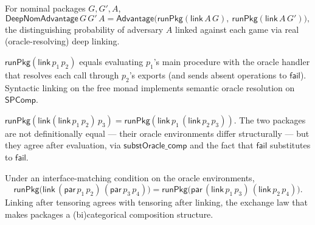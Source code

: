 \begin{definition}
  \label{def:deepnomadv}
  \leanok
  For nominal packages $G, G', A$,
  \[
    \mathsf{DeepNomAdvantage}\,G\,G'\,A =
    \mathsf{Advantage}\bigl(\mathsf{runPkg}(\mathsf{link}\,A\,G),\
    \mathsf{runPkg}(\mathsf{link}\,A\,G')\bigr),
  \]
  the distinguishing probability of adversary $A$ linked against each game via
  real (oracle-resolving) deep linking.
\end{definition}

\begin{theorem}
  \label{thm:runpkg-link}
  \leanok
  $\mathsf{runPkg}(\mathsf{link}\,p_1\,p_2)$ equals evaluating $p_1$'s main
  procedure with the oracle handler that resolves each call through $p_2$'s
  exports (and sends absent operations to $\mathsf{fail}$). Syntactic linking on
  the free monad implements semantic oracle resolution on $\mathsf{SPComp}$.
\end{theorem}

\begin{theorem}
  \label{thm:runpkg-link-assoc}
  \lean{CatCrypt.Crypto.runPkg_link_assoc}
  \leanok
  $\mathsf{runPkg}(\mathsf{link}(\mathsf{link}\,p_1\,p_2)\,p_3) =
  \mathsf{runPkg}(\mathsf{link}\,p_1\,(\mathsf{link}\,p_2\,p_3))$. The two
  packages are not definitionally equal — their oracle environments differ
  structurally — but they agree after evaluation, via $\mathsf{substOracle\_comp}$
  and the fact that $\mathsf{fail}$ substitutes to $\mathsf{fail}$.
\end{theorem}

\begin{theorem}
  \label{thm:runpkg-interchange}
  \leanok
  Under an interface-matching condition on the oracle environments,
  \[
    \mathsf{runPkg}\bigl(\mathsf{link}\,(\mathsf{par}\,p_1\,p_2)\,(\mathsf{par}\,p_3\,p_4)\bigr)
    = \mathsf{runPkg}\bigl(\mathsf{par}\,(\mathsf{link}\,p_1\,p_3)\,(\mathsf{link}\,p_2\,p_4)\bigr).
  \]
  Linking after tensoring agrees with tensoring after linking, the exchange law
  that makes packages a (bi)categorical composition structure.
\end{theorem}

